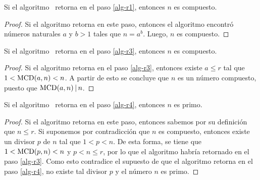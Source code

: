 	\begin{proposition}
		Si el algoritmo \AKS\ retorna en el paso \ref{alg-r1}, entonces $n$ es compuesto. 
	\end{proposition}
	\begin{proof}
	Si el algoritmo retorna en este paso, entonces el algoritmo encontró números naturales $a$ y $b>1$ tales que $n=a^b$. Luego, $n$ es compuesto.
	\end{proof}
	
	\begin{proposition}
		Si el algoritmo \AKS\ retorna en el paso \ref{alg-r3}, entonces $n$ es compuesto. 
	\end{proposition}
	\begin{proof}
	Si el algoritmo retorna en el paso \ref{alg-r3}, entonces existe $a \leq r$ tal que $1<{\rm MCD}(a,n)<n$. A partir de esto se concluye que $n$ es un número compuesto, puesto que ${\rm MCD}(a,n) \hspace{1.8pt}|\hspace{1.8pt} n$. 
	\end{proof}
	\begin{proposition}
	Si el algoritmo \AKS\ retorna en el paso \ref{alg-r4}, entonces $n$ es primo. 
	\end{proposition}
	\begin{proof}
	  Si el algoritmo retorna en este paso, entonces sabemos por su definición
          que $n\leq r$. Si suponemos por contradicción que $n$ es compuesto, entonces existe un divisor $p$ de $n$ tal que $1 < p < n$. De esta forma, se tiene que $1 < {\rm MCD}(p,n) < n$ y $p < n \leq r$, por lo que el algoritmo habría retornado en el paso \ref{alg-r3}.
	Como esto contradice el supuesto de que el algoritmo retorna en el paso \ref{alg-r4}, no existe tal divisor $p$ y el número $n$ es primo. 
	\end{proof}
